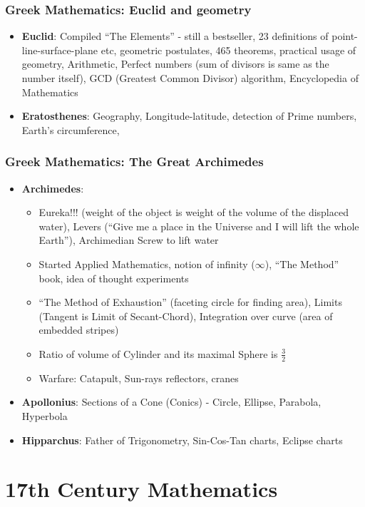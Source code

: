 \begin{frame}[fragile]
\frametitle{Greek Mathematics: Euclid and geometry}
\begin{itemize}
\item \textbf{Euclid}: Compiled ``The Elements'' - still a bestseller, 23 definitions of point-line-surface-plane etc,  geometric postulates, 465 theorems, practical usage of geometry, Arithmetic,  Perfect numbers (sum of divisors is same as the number itself),  GCD (Greatest Common Divisor) algorithm, Encyclopedia of Mathematics
\item \textbf{Eratosthenes}: Geography, Longitude-latitude, detection of Prime numbers, Earth's circumference, 
\end{itemize}
\end{frame}


\begin{frame}[fragile]
\frametitle{Greek Mathematics: The Great Archimedes}
\begin{itemize}
\item \textbf{Archimedes}: 
	\begin{itemize}
	\item Eureka!!! (weight of the object is weight of the volume of the displaced water), Levers (``Give me a place in the Universe and I will lift the whole Earth''), 	Archimedian Screw to lift water
	\item Started Applied Mathematics, notion of infinity ($\infty$), ``The Method'' book, idea of thought experiments
	\item ``The Method of Exhaustion'' (faceting circle for finding area), Limits (Tangent is Limit of Secant-Chord), Integration over curve (area of embedded stripes)
	\item Ratio of volume of Cylinder and its maximal Sphere is $\frac{3}{2}$
	\item Warfare: Catapult, Sun-rays reflectors, cranes
	\end{itemize}
\item \textbf{Apollonius}: Sections of a Cone (Conics) - Circle, Ellipse, Parabola, Hyperbola
\item \textbf{Hipparchus}: Father of Trigonometry, Sin-Cos-Tan charts, Eclipse charts 
\end{itemize}
\end{frame}

\section{17th Century Mathematics}

